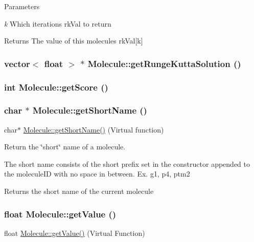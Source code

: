\begin{DoxyParams}{Parameters}
\item[{\em k}]Which iterations rkVal to return\end{DoxyParams}
\begin{DoxyReturn}{Returns}
The value of this molecules rkVal\mbox{[}k\mbox{]} 
\end{DoxyReturn}
\hypertarget{classMolecule_a4405c3a17adfed340826d8b31e4da589}{
\subsubsection[{getRungeKuttaSolution}]{\setlength{\rightskip}{0pt plus 5cm}vector$<$ float $>$ $\ast$ Molecule::getRungeKuttaSolution ()}}
\label{classMolecule_a4405c3a17adfed340826d8b31e4da589}
\hypertarget{classMolecule_a125243e73faff1e5e482e65ba923ca3a}{
\subsubsection[{getScore}]{\setlength{\rightskip}{0pt plus 5cm}int Molecule::getScore ()}}
\label{classMolecule_a125243e73faff1e5e482e65ba923ca3a}
\hypertarget{classMolecule_a6d8720e89d81c1297beced997ad62718}{
\subsubsection[{getShortName}]{\setlength{\rightskip}{0pt plus 5cm}char $\ast$ Molecule::getShortName ()}}
\label{classMolecule_a6d8720e89d81c1297beced997ad62718}
char$\ast$ \hyperlink{classMolecule_a6d8720e89d81c1297beced997ad62718}{Molecule::getShortName()} (Virtual function)

Return the \char`\"{}short\char`\"{} name of a molecule.

The short name consists of the short prefix set in the constructor appended to the moleculeID with no space in between. Ex. g1, p4, ptm2

\begin{DoxyReturn}{Returns}
the short name of the current molecule 
\end{DoxyReturn}
\hypertarget{classMolecule_a554ea822918374775d5f52b5d49d8195}{
\subsubsection[{getValue}]{\setlength{\rightskip}{0pt plus 5cm}float Molecule::getValue ()}}
\label{classMolecule_a554ea822918374775d5f52b5d49d8195}
float \hyperlink{classMolecule_a554ea822918374775d5f52b5d49d8195}{Molecule::getValue()} (Virtual Function)

